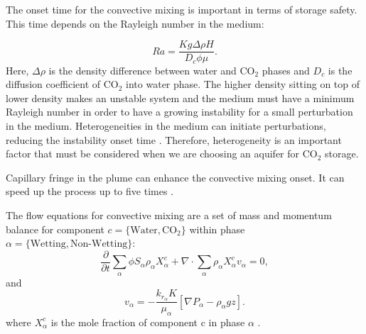 The onset time for the convective mixing is important in terms of storage
safety. This time depends on the Rayleigh number in the medium:

\begin{equation}
 Ra = \frac{Kg\Delta \rho H}{D_c \phi \mu}.
 \label{Ra}
\end{equation} Here, $\Delta \rho$ is the density difference between water and
$\mbox{CO}_2$ phases and $D_c$ is the diffusion coefficient of $\mbox{CO}_2$
into water phase. The higher density sitting on top of lower density makes an
unstable system and the medium must have a minimum Rayleigh number in order to
have a growing instability for a small perturbation in the medium.
Heterogeneities in the medium can initiate perturbations, reducing the
instability onset time \cite{hassanzadeh2005modelling,elenius2012time}.
Therefore, heterogeneity is an important factor that must be considered when we
are choosing an aquifer for $\mbox{CO}_2$ storage.

Capillary fringe in the plume can enhance the convective mixing onset. It can
speed up the process up to five times \cite{eleniuseffects}.

The flow equations for convective mixing are a set of mass and momentum balance
for component $c=\{\mbox{Water},\mbox{CO}_2\}$ within phase
$\alpha=\{\mbox{Wetting},\mbox{Non-Wetting}\}$:
\begin{equation}
\frac{\partial}{\partial t} \underset{\alpha}{\sum}\phi S_\alpha \rho_\alpha
X_{\alpha}^c + \nabla \cdot \underset{\alpha}{\sum} \rho_\alpha X_{\alpha}^c
v_\alpha = 0,   
 \label{eq:massCo2}
\end{equation} and 
\begin{equation}
 v_\alpha = -\frac{k_{r_\alpha}K}{\mu_\alpha} \left[  \nabla
P_\alpha-\rho_\alpha g z \right].
 \label{eq:darcyCo2}
\end{equation} where $X_{\alpha}^c$ is the mole fraction of
component $\mbox{c}$ in phase $\alpha$ \cite{elenius2010co2}. 


